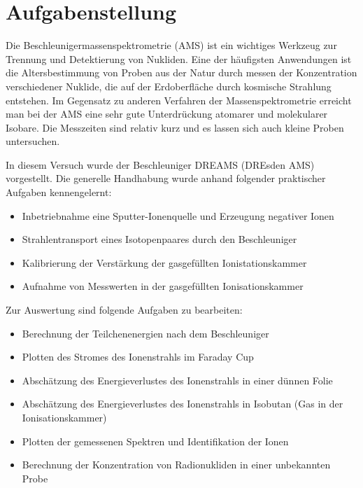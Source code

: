 \section{Aufgabenstellung}
Die Beschleunigermas­senspektrometrie (AMS) ist ein wichtiges Werkzeug zur Trennung und Detektierung von Nukliden.
Eine der häufigsten Anwendungen ist die Altersbestimmung von Proben aus der Natur durch messen der Konzentration verschiedener Nuklide, die auf der Erdoberfläche durch kosmische Strahlung entstehen.
Im Gegensatz zu anderen Verfahren der Massenspektrometrie erreicht man bei der AMS eine sehr gute Unterdrückung atomarer und molekularer Isobare.
Die Messzeiten sind relativ kurz und es lassen sich auch kleine Proben untersuchen.

In diesem Versuch wurde der Beschleuniger DREAMS (DREsden AMS) vorgestellt.
Die generelle Handhabung wurde anhand folgender praktischer Aufgaben kennengelernt:
\begin{itemize}
  \item Inbetriebnahme eine Sputter-Ionenquelle und Erzeugung negativer Ionen
  \item Strahlentransport eines Isotopenpaares durch den Beschleuniger
  \item Kalibrierung der Verstärkung der gasgefüllten Ionistationskammer
  \item Aufnahme von Messwerten in der gasgefüllten Ionisationskammer
\end{itemize}

Zur Auswertung sind folgende Aufgaben zu bearbeiten:
\begin{itemize}
  \item Berechnung der Teilchenenergien nach dem Beschleuniger
  \item Plotten des Stromes des Ionenstrahls im Faraday Cup
  \item Abschätzung des Energieverlustes des Ionenstrahls in einer dünnen Folie
  \item Abschätzung des Energieverlustes des Ionenstrahls in Isobutan (Gas in der Ionisationskammer)
  \item Plotten der gemessenen Spektren und Identifikation der Ionen
  \item Berechnung der Konzentration von Radionukliden in einer unbekannten Probe
\end{itemize}
